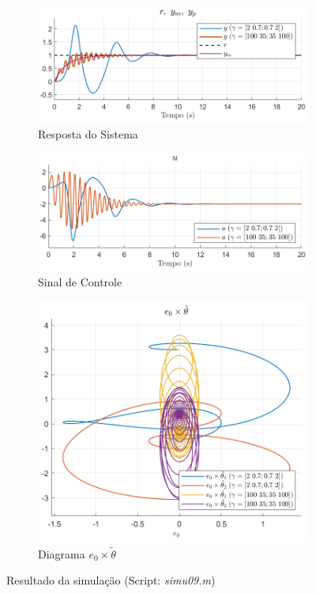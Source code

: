 \documentclass[10pt]{article}
\begin{document}
\begin{figure}[h!]
    \begin{subfigure}[b]{0.25\textwidth}
        \centering
        \includegraphics[width=\textwidth]{img/fig09c.png}
        \caption{Resposta do Sistema}
    \end{subfigure}
    \begin{subfigure}[b]{0.25\textwidth}
        \centering
        \includegraphics[width=\textwidth]{img/fig09e.png}
        \caption{Sinal de Controle}
    \end{subfigure}

    \begin{subfigure}[b]{0.25\textwidth}
        \centering
        \includegraphics[width=\textwidth]{img/fig09d.png}
        \caption{Diagrama $e_0 \times \tilde{\theta}$}
    \end{subfigure}

    \caption{Resultado da simulação (Script: \textit{simu09.m})}
    \label{fig:sim9}
\end{figure}
\end{document}
